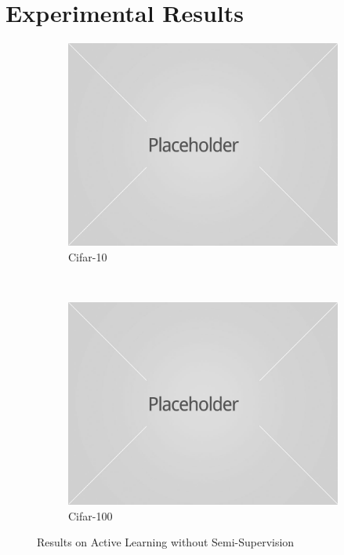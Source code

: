 \documentclass{article}
\begin{document}
\section{Experimental Results}
\label{sec:exp}
\begin{figure}[ht]
    \centering
    \begin{subfigure}[b]{0.4927\textwidth}
        \includegraphics[width=\textwidth]{placeholder1.jpg}
        \caption{Cifar-10}
    \end{subfigure}
    ~ %
    \begin{subfigure}[b]{0.4927\textwidth}
        \includegraphics[width=\textwidth]{placeholder1.jpg}
        \caption{Cifar-100}
    \end{subfigure}
    \caption{Results on Active Learning without Semi-Supervision}\label{fig:resnosemi}
   \vspace{5mm}


\end{figure}
\end{document}
